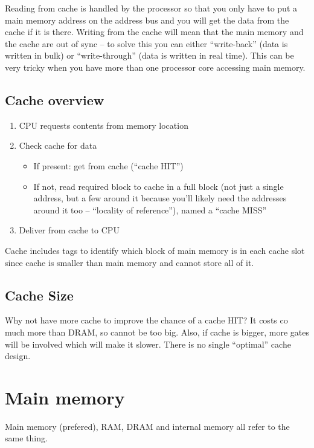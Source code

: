 Reading from cache is handled by the processor so that you only have to put a main memory address on the address bus and you will get the data from the cache if it is there.
Writing from the cache will mean that the main memory and the cache are out of sync -- to solve this you can either ``write-back'' (data is written in bulk) or ``write-through'' (data is written in real time).
This can be very tricky when you have more than one processor core accessing main memory.

\subsection{Cache overview}\label{sub:cache_overview}

\begin{enumerate}
	\item CPU requests contents from memory location
	\item Check cache for data
	      \begin{itemize}
		      \item If present: get from cache (``cache HIT'')
		      \item If not, read required block to cache in a full block (not just a single address, but a few around it because you'll likely need the addresses around it too -- ``locality of reference''), named a ``cache MISS''
	      \end{itemize}
	\item Deliver from cache to CPU
\end{enumerate}
Cache includes tags to identify which block of main memory is in each cache slot since cache is smaller than main memory and cannot store all of it.

\subsection{Cache Size}\label{sub:cache_size}

Why not have more cache to improve the chance of a cache HIT?
It costs co much more than DRAM, so cannot be too big.
Also, if cache is bigger, more gates will be involved which will make it slower.
There is no single ``optimal'' cache design.

\section{Main memory}\label{sec:main_memory}

Main memory (prefered), RAM, DRAM and internal memory all refer to the same thing.

